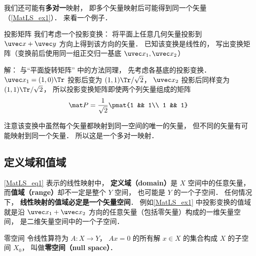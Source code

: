 我们还可能有\textbf{多对一}映射， 即多个矢量映射后可能得到同一个矢量（\autoref{MatLS_ex1}）． 来看一个例子．

\begin{example}{投影矩阵}\label{MatLS_ex1}
我们考虑一个投影变换： 将平面上任意几何矢量投影到 $\uvec x + \uvec y$ 方向上得到该方向的矢量． 已知该变换是线性的， 写出变换矩阵（变换前后使用同一组正交归一基底 $\uvec x_1, \uvec x_2$）

解： 与“平面旋转矩阵” 中的方法同理， 先考虑各基底的投影变换． $\uvec x_1 = (1, 0)\Tr$ 投影后变为 $(1, 1)\Tr /\sqrt2$， $\uvec x_2$ 投影后同样变为 $(1, 1)\Tr /\sqrt2$， 所以投影变换矩阵即使两个列矢量组成的矩阵
\begin{equation}
\mat P = \frac{1}{\sqrt{2}} \pmat{1 && 1\\ 1 && 1}
\end{equation}

注意该变换中虽然每个矢量都映射到同一空间的唯一的矢量， 但不同的矢量有可能映射到同一个矢量． 所以这是一个多对一映射．
\end{example}

\subsection{定义域和值域}
\autoref{MatLS_eq1} 表示的线性映射中， \textbf{定义域（domain）}是 $X$ 空间中的任意矢量， 而\textbf{值域（range）}却不一定是整个 $Y$ 空间， 也可能是 $Y$ 的一个子空间． 任何情况下， \textbf{线性映射的值域必定是一个矢量空间}． 例如\autoref{MatLS_ex1} 中投影变换的值域就是沿 $\uvec x_1 + \uvec x_2$ 方向的任意矢量（包括零矢量）构成的一维矢量空间， 是二维矢量空间中的一个子空间．



\begin{theorem}{零空间}
令线性算符为 $A: X\to Y$， $A x = 0$ 的所有解 $x\in X$ 的集合构成 $X$ 的子空间 $X_0$， 叫做\textbf{零空间（null space）}．
\end{theorem}
